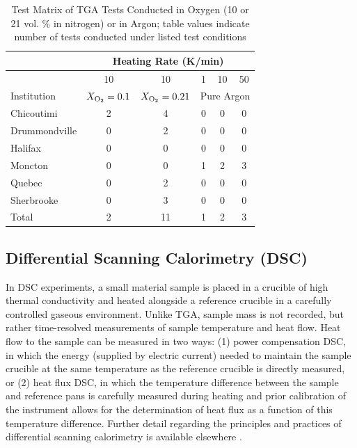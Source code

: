\documentclass{book}
\begin{document}
\begin{table} [h]
\caption{Test Matrix of TGA Tests Conducted in Oxygen (10 or 21 vol. \% in nitrogen) or in Argon; table values indicate number of tests conducted under listed test conditions}
\label{Table:Matrix_TGA_O2_Ar}
\begin{center}
\begin{tabular}{lccccc}
\hline
              & \multicolumn{5}{c}{Heating Rate (K/min)} \\ \hline
              & 10 & 10 & 1 & 10 & 50  \\ %
Institution   & $X_{\rm O_2}=0.1$ & $X_{\rm O_2}=0.21$ & \multicolumn{3}{c}{Pure Argon}  \\ \hline
Chicoutimi    & 2 & 4   & 0 & 0 & 0 \\
Drummondville & 0 & 2   & 0 & 0 & 0 \\
Halifax       & 0 & 0   & 0 & 0 & 0 \\
Moncton       & 0 & 0   & 1 & 2 & 3 \\
Quebec        & 0 & 2   & 0 & 0 & 0 \\
Sherbrooke    & 0 & 3   & 0 & 0 & 0 \\ \hline
Total         & 2 & 11  & 1 & 2 & 3 \\ \hline
\end{tabular}
\end{center}
\end{table}


\subsection{Differential Scanning Calorimetry (DSC)}

In DSC experiments, a small material sample is placed in a crucible of high thermal conductivity and heated alongside a reference crucible in a carefully controlled gaseous environment. Unlike TGA, sample mass is not recorded, but rather time-resolved measurements of sample temperature and heat flow. Heat flow to the sample can be measured in two ways: (1) power compensation DSC, in which the energy (supplied by electric current) needed to maintain the sample crucible at the same temperature as the reference crucible is directly measured, or (2) heat flux DSC, in which the temperature difference between the sample and reference pans is carefully measured during heating and prior calibration of the instrument allows for the determination of heat flux as a function of this temperature difference. Further detail regarding the principles and practices of differential scanning calorimetry is available elsewhere \cite{mcnaughton2003differential}.
\end{document}

